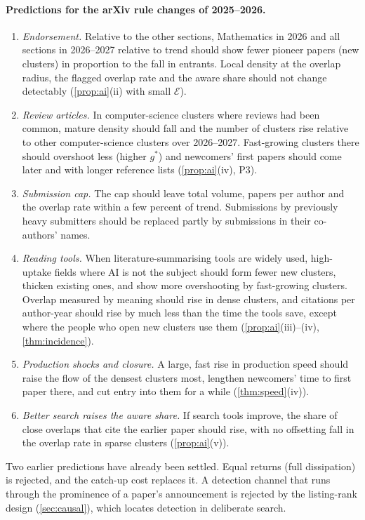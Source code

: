 \paragraph{Predictions for the arXiv rule changes of 2025--2026.}
\begin{enumerate}[label=\textbf{P\arabic*.},leftmargin=*,resume]
\item \emph{Endorsement.} Relative to the other sections, Mathematics in
2026 and all sections in 2026--2027 relative to trend should show fewer pioneer
papers (new clusters) in proportion to the fall in entrants. Local density at
the overlap radius, the flagged overlap rate and the aware share should not
change detectably (\cref{prop:ai}(ii) with small $\mathcal E$).
\item \emph{Review articles.} In computer-science clusters where reviews had been
common, mature density should fall and the number of clusters rise relative to
other computer-science clusters over 2026--2027. Fast-growing clusters there
should overshoot less (higher $g^*$) and newcomers' first papers should come
later and with longer reference lists (\cref{prop:ai}(iv), P3).
\item \emph{Submission cap.} The cap should leave total volume, papers per
author and the overlap rate within a few percent of trend. Submissions by
previously heavy submitters should be replaced partly by submissions in their
co-authors' names.
\item \emph{Reading tools.} When literature-summarising tools are widely used,
high-uptake fields where AI is not the subject should form fewer new clusters,
thicken existing ones, and show more overshooting by fast-growing clusters.
Overlap measured by meaning should rise in dense clusters, and citations per
author-year should rise by much less than the time the tools save, except where
the people who open new clusters use them (\cref{prop:ai}(iii)--(iv),
\cref{thm:incidence}).
\item \emph{Production shocks and closure.} A large, fast rise in production
speed should raise the flow of the densest clusters most, lengthen newcomers'
time to first paper there, and cut entry into them for a while
(\cref{thm:speed}(iv)).
\item \emph{Better search raises the aware share.} If search tools improve, the
share of close overlaps that cite the earlier paper should rise, with no
offsetting fall in the overlap rate in sparse clusters (\cref{prop:ai}(v)).
\end{enumerate}

Two earlier predictions have already been settled. Equal returns (full
dissipation) is rejected, and the catch-up cost replaces it. A detection
channel that runs through the prominence of a paper's announcement is rejected
by the listing-rank design (\cref{sec:causal}), which locates detection in
deliberate search.
